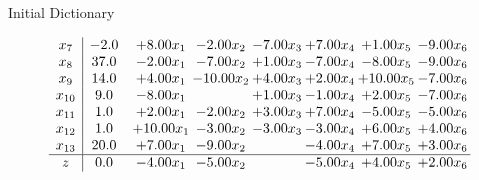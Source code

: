\documentclass[8pt]{article}
\begin{document}
Initial Dictionary 

\[\begin{array}{c| c c@{\hskip 2pt} c@{\hskip 2pt} c@{\hskip 2pt} c@{\hskip 2pt} c@{\hskip 2pt} c@{\hskip 2pt} }
 x_{7}   &  -2.0 & +  8.00 x_{1} & -2.00 x_{2} & -7.00 x_{3} & +  7.00 x_{4} & +  1.00 x_{5} & -9.00 x_{6}\\
 x_{8}   &  37.0 & -2.00 x_{1} & -7.00 x_{2} & +  1.00 x_{3} & -7.00 x_{4} & -8.00 x_{5} & -9.00 x_{6}\\
 x_{9}   &  14.0 & +  4.00 x_{1} & -10.00 x_{2} & +  4.00 x_{3} & +  2.00 x_{4} & + 10.00 x_{5} & -7.00 x_{6}\\
 x_{10}   &  9.0 & -8.00 x_{1} &   & +  1.00 x_{3} & -1.00 x_{4} & +  2.00 x_{5} & -7.00 x_{6}\\
 x_{11}   &  1.0 & +  2.00 x_{1} & -2.00 x_{2} & +  3.00 x_{3} & +  7.00 x_{4} & -5.00 x_{5} & -5.00 x_{6}\\
 x_{12}   &  1.0 & + 10.00 x_{1} & -3.00 x_{2} & -3.00 x_{3} & -3.00 x_{4} & +  6.00 x_{5} & +  4.00 x_{6}\\
 x_{13}   &  20.0 & +  7.00 x_{1} & -9.00 x_{2} &   & -4.00 x_{4} & +  7.00 x_{5} & +  3.00 x_{6}\\
\hline
z    &  0.0 & -4.00 x_{1} & -5.00 x_{2} &   & -5.00 x_{4} & +  4.00 x_{5} & +  2.00 x_{6}\\
\end{array}\]
\end{document}
